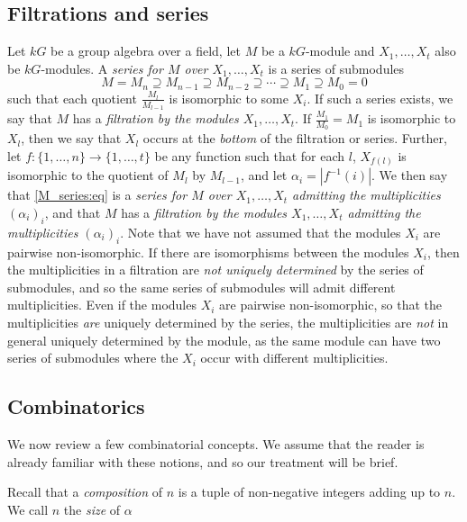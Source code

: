 \subsection{Filtrations and series}\label{filt_ser:subsec}
Let $kG$ be a group algebra over a field, let $M$ be a $kG$-module and $X_1,\ldots,X_t$ also be $kG$-modules. A \textit{series for $M$
over $X_1,\ldots,X_t$} is a series of submodules
\begin{equation}\label{M_series:eq}
  M = M_n \supseteq M_{n-1} \supseteq M_{n-2} \supseteq \cdots \supseteq M_1 \supseteq M_0 = 0
\end{equation}
such that each quotient $\frac{M_l}{M_{l-1}}$ is isomorphic to some $X_i$. If such a series exists, we say that $M$ has a
\textit{filtration by the modules $X_1,\ldots,X_t$}. If $\frac{M_1}{M_0} = M_1$ is isomorphic to $X_l$, then we say that $X_l$ occurs at
the \textit{bottom} of the filtration or series. Further, let $f:\{1,\ldots,n\} \longrightarrow \{1,\ldots,t\}$ be any function such
that for each $l$, $X_{f(l)}$ is isomorphic to the quotient of $M_l$ by $M_{l-1}$, and let $\alpha_i = |f^{-1}(i)|$. We then say that
\eqref{M_series:eq}
is a \textit{series for $M$ over $X_1,\ldots,X_t$ admitting the multiplicities $(\alpha_i)_i$}, and that $M$ has a
\textit{filtration by the modules $X_1,\ldots,X_t$ admitting the multiplicities $(\alpha_i)_i$}.
Note that we have not assumed that the modules $X_i$ are pairwise non-isomorphic. If there are isomorphisms between the modules
$X_i$, then the multiplicities in a filtration are \textit{not uniquely determined} by the series of submodules, and so the same series
of submodules will admit different multiplicities. Even if the modules $X_i$ are pairwise non-isomorphic, so that the multiplicities
\textit{are} uniquely determined by the series, the multiplicities are \textit{not} in general uniquely determined by the module,
as the same module can have two series of submodules where the $X_i$ occur with different multiplicities.

\subsection{Combinatorics}
We now review a few combinatorial concepts. We assume that the reader is already familiar with these notions, and so our treatment will
be brief.

Recall that a \textit{composition} of $n$ is a tuple of non-negative integers adding up to $n$. We call $n$ the \textit{size} of $\alpha$
